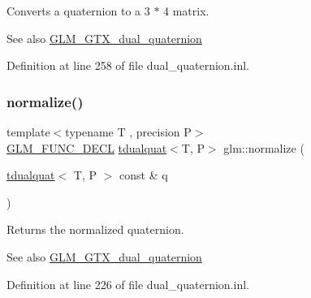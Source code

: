 Converts a quaternion to a 3 $\ast$ 4 matrix.

\begin{DoxySeeAlso}{See also}
\mbox{\hyperlink{group__gtx__dual__quaternion}{G\+L\+M\+\_\+\+G\+T\+X\+\_\+dual\+\_\+quaternion}} 
\end{DoxySeeAlso}


Definition at line 258 of file dual\+\_\+quaternion.\+inl.

\mbox{\label{group__gtx__dual__quaternion_ga495818aa48c23e9e730f87a3c337d1d5}} 
\subsubsection{\texorpdfstring{normalize()}{normalize()}}
{\footnotesize\ttfamily template$<$typename T , precision P$>$ \\
\mbox{\hyperlink{setup_8hpp_ab2d052de21a70539923e9bcbf6e83a51}{G\+L\+M\+\_\+\+F\+U\+N\+C\+\_\+\+D\+E\+CL}} \mbox{\hyperlink{structglm_1_1tdualquat}{tdualquat}}$<$T, P$>$ glm\+::normalize (\begin{DoxyParamCaption}\item[{\mbox{\hyperlink{structglm_1_1tdualquat}{tdualquat}}$<$ T, P $>$ const \&}]{q }\end{DoxyParamCaption})}

Returns the normalized quaternion.

\begin{DoxySeeAlso}{See also}
\mbox{\hyperlink{group__gtx__dual__quaternion}{G\+L\+M\+\_\+\+G\+T\+X\+\_\+dual\+\_\+quaternion}} 
\end{DoxySeeAlso}


Definition at line 226 of file dual\+\_\+quaternion.\+inl.

\mbox{\label{group__gtx__dual__quaternion_gacb43d8513f47848a1e228f7cfa47b4a8}} 
